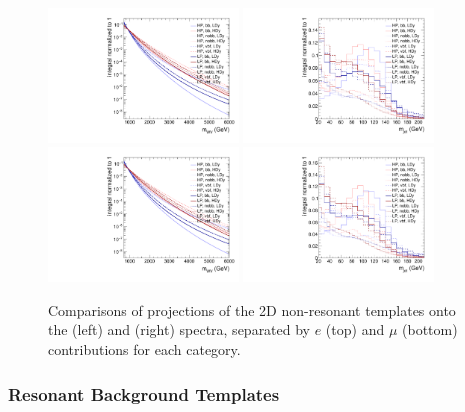 \begin{figure}[htbp]
  \centering
  \includegraphics[width=0.45\textwidth]{fig/2Dfit/compTemplate_nonRes_e_MVV_log.pdf}
  \includegraphics[width=0.45\textwidth]{fig/2Dfit/compTemplate_nonRes_e_MJJ.pdf}\\
  \includegraphics[width=0.45\textwidth]{fig/2Dfit/compTemplate_nonRes_mu_MVV_log.pdf}
  \includegraphics[width=0.45\textwidth]{fig/2Dfit/compTemplate_nonRes_mu_MJJ.pdf}\\
  \caption{
    Comparisons of projections of the 2D non-resonant templates onto the \MVV (left) and \MJ (right) spectra, separated by $e$ (top) and $\mu$ (bottom) contributions for each category.
  }
  \label{fig:compTemplate_nonRes}
\end{figure}

\subsubsection{Resonant Background Templates}

